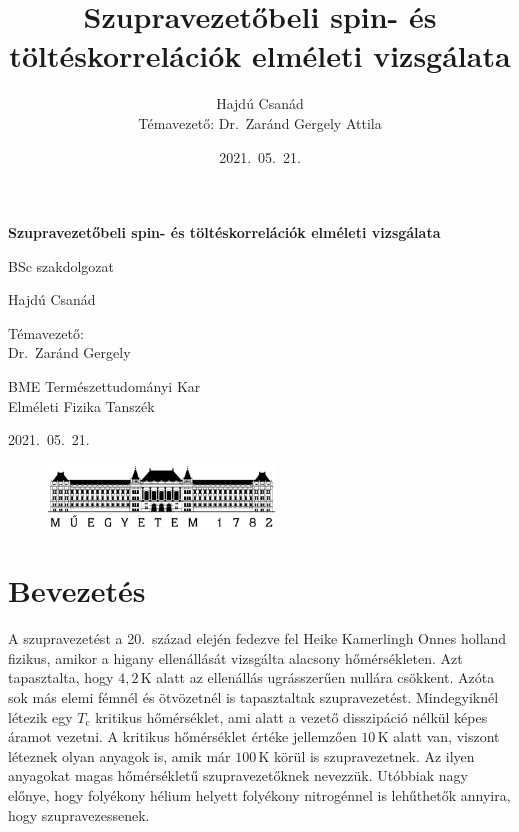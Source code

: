 \documentclass[a4paper,12pt,titlepage]{article}
\title{\bf Szupravezetőbeli spin- és töltéskorrelációk elméleti vizsgálata}
\author{Hajdú Csanád \\ \small Témavezető: Dr.\ Zaránd Gergely Attila}
\date{2021.\ 05.\ 21.}
\begin{document}
\begin{titlepage}
\begin{center}
	\vspace*{1cm}
	\textbf{\huge Szupravezetőbeli spin- és töltéskorrelációk elméleti vizsgálata}

	\vspace{1cm}

	BSc szakdolgozat

	\vspace{2.5cm}

	\Large
	Hajdú Csanád

	\vspace{2.5cm}
	{\normalsize Témavezető:} \\
	Dr.\ Zaránd Gergely

	\vfill

	BME Természettudományi Kar \\
	Elméleti Fizika Tanszék

	\vspace{1.5cm}

	2021.\ 05.\ 21.

	\begin{figure}[b]
		\centering
		\includegraphics[width=6cm]{bme-logo.png}
	\end{figure}
\end{center}
\end{titlepage}

\null
\thispagestyle{empty}
\addtocounter{page}{-1}
\newpage

\tableofcontents \newpage


\section{Bevezetés}

A szupravezetést a 20.\ század elején fedezve fel Heike Kamerlingh Onnes holland fizikus, amikor a higany ellenállását vizsgálta alacsony hőmérsékleten.  Azt tapasztalta, hogy $4,2$\,K alatt az ellenállás ugrásszerűen nullára csökkent.  Azóta sok más elemi fémnél és ötvözetnél is tapasztaltak szupravezetést.  Mindegyiknél létezik egy $T_\text{c}$ kritikus hőmérséklet, ami alatt a vezető disszipáció nélkül képes áramot vezetni.  A kritikus hőmérséklet értéke jellemzően $10$\,K alatt van, viszont léteznek olyan anyagok is, amik már $100$\,K körül is szupravezetnek.  Az ilyen anyagokat magas hőmérsékletű szupravezetőknek nevezzük.  Utóbbiak nagy előnye, hogy folyékony hélium helyett folyékony nitrogénnel is lehűthetők annyira, hogy szupravezessenek.
\end{document}
